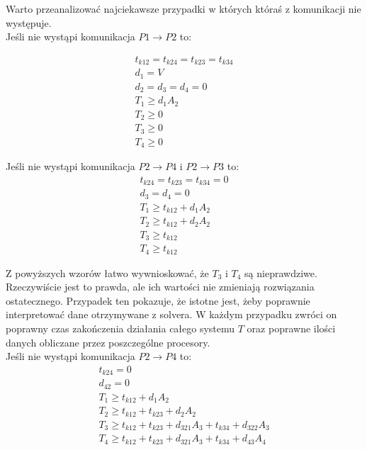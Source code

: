 Warto przeanalizować najciekawsze przypadki w których któraś z komunikacji nie występuje. \\

Jeśli nie wystąpi komunikacja $P1 \to P2$ to:

\begin{equation}
\begin{array}{l}
t_{k12} = t_{k24} = t_{k23} = t_{k34} \\
d_{1} = V \\
d_{2} = d_{3} = d_{4} = 0 \\
T_{1} \geq d_{1}A_{2} \\
T_{2} \geq 0 \\
T_{3} \geq 0 \\
T_{4} \geq 0
\end{array} 
\end{equation}

Jeśli nie wystąpi komunikacja $P2 \to P4$ i $P2 \to P3$ to:
\begin{equation}
\begin{array}{l}
t_{k24} = t_{k23} = t_{k34} = 0 \\
d_{3} = d_{4} = 0 \\
T_{1} \geq t_{k12} + d_{1}A_{2} \\
T_{2} \geq t_{k12} + d_{2}A_{2} \\
T_{3} \geq t_{k12} \\
T_{4} \geq t_{k12}
\end{array}
\end{equation}

Z powyższych wzorów łatwo wywnioskować, że $T_{3}$ i $T_{4}$ są nieprawdziwe. Rzeczywiście jest to prawda, ale ich wartości nie zmieniają rozwiązania ostatecznego.
Przypadek ten pokazuje, że istotne jest, żeby poprawnie interpretować dane otrzymywane z solvera. W każdym przypadku zwróci on poprawny czas zakończenia działania całego systemu $T$
oraz poprawne ilości danych obliczane przez poszczególne procesory. \\

Jeśli nie wystąpi komunikacja $P2 \to P4$ to:
\begin{equation}
\begin{array}{l}
t_{k24} = 0 \\
d_{42} = 0 \\
T_{1} \geq t_{k12} + d_{1}A_{2} \\
T_{2} \geq t_{k12} + t_{k23} + d_{2}A_{2} \\
T_{3} \geq t_{k12} + t_{k23} + d_{321}A_{3} + t_{k34} + d_{322}A_{3} \\
T_{4} \geq t_{k12} + t_{k23} + d_{321}A_{3} + t_{k34} + d_{43}A_{4}
\end{array}
\end{equation}

